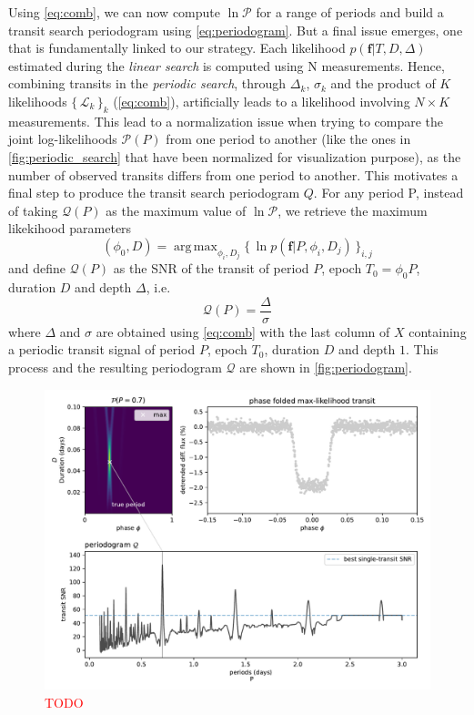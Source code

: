 \documentclass{aastex631}
\DeclareMathOperator*{\argmax}{arg\,max}
\newcommand{\set}[1]{\{\,#1\,\}}
\newcommand{\TODO}{\textcolor{red}{TODO}}
\begin{document}
Using \autoref{eq:comb}, we can now compute $\ln\mathcal{P}$ for a range of periods and build a transit search periodogram using \autoref{eq:periodogram}. But a final issue emerges, one that is fundamentally linked to our strategy. Each likelihood $p(\bm{f} \vert T, D, \Delta)$ estimated during the \textit{linear search} is computed using N measurements. Hence, combining transits in the \textit{periodic search}, through $\Delta_k$, $\sigma_k$ and the product of $K$ likelihoods $\set{\mathcal{L}_k}_k$ (\autoref{eq:comb}), artificially leads to a likelihood involving $N\times K$ measurements. This lead to a normalization issue when trying to compare the joint log-likelihoods $\mathcal{P}(P)$ from one period to another (like the ones in \autoref{fig:periodic_search} that have been normalized for visualization purpose), as the number of observed transits differs from one period to another. This motivates a final step to produce the transit search periodogram $Q$. For any period P, instead of taking $ \mathcal{Q}(P)$ as the maximum value of $\ln\mathcal{P}$, we retrieve the maximum likekihood parameters
\begin{equation}\label{eq:phi0}
    (\phi_0 ,D) = \argmax_{\phi_i, D_j} \set{\ln p(\bm{f} \vert P, \phi_i, D_j)}_{i, j}
\end{equation}
and define $\mathcal{Q}(P)$ as the SNR of the transit of period $P$, epoch $T_0 = \phi_0 P$, duration $D$ and depth $\Delta$, i.e.
$$
    \mathcal{Q}(P) = \frac{\Delta}{\sigma}
$$
where $\Delta$ and $\sigma$ are obtained using \autoref{eq:comb} with the last column of $X$ containing a periodic transit signal of period $P$, epoch $T_0$, duration $D$ and depth $1$. This process and the resulting periodogram $\mathcal{Q}$ are shown in \autoref{fig:periodogram}.


\begin{figure}[H]
    \begin{centering}
        \includegraphics[width=0.8\linewidth]{../figures/principle_Q.pdf}
        \caption{\TODO}
        \label{fig:periodogram}
    \end{centering}
\end{figure}
\end{document}
